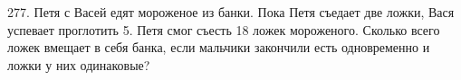 277. Петя с Васей едят мороженое из банки. Пока Петя съедает две ложки, Вася успевает проглотить 5. Петя смог съесть 18 ложек мороженого. Сколько всего ложек вмещает в себя банка, если мальчики закончили есть одновременно и ложки у них одинаковые?\\
